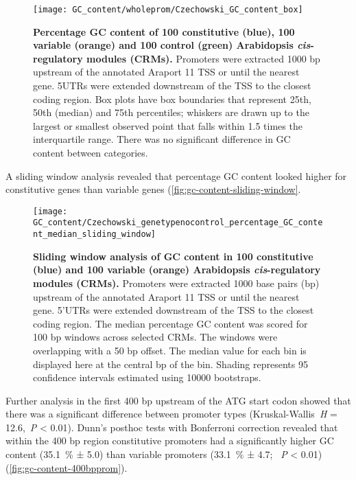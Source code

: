 \documentclass[../main.tex]{subfiles}
\begin{document}
\begin{figure}[hbt!]
	\begin{center}
		\capstart
		\texttt{[image: GC\_content/wholeprom/Czechowski\_GC\_content\_box]}
		\caption{
			\textbf{Percentage GC content of 100 constitutive (blue), 100 variable (orange) and 100 control (green) Arabidopsis \textit{cis}\hyp{}regulatory modules (CRMs).}
			Promoters were extracted 1000 bp upstream of the annotated Araport 11 \autocite{chengAraport11CompleteReannotation2017} TSS or until the nearest gene.
			5UTRs were extended downstream of the TSS to the closest coding region.  Box plots have box boundaries that represent 25th, 50th (median) and 75th percentiles; whiskers are drawn up to the largest or smallest observed point that falls within 1.5 times the interquartile range.
			There was no significant difference in GC content between categories.
			\label{fig:gc-content-wholeprom}
		}
	\end{center}
\end{figure}

A sliding window analysis revealed that percentage GC content looked higher for constitutive genes than variable genes (\autoref{fig:gc-content-sliding-window}.
\begin{figure}[hbt!]
	\begin{center}
		\capstart
		\texttt{[image: GC\_content/Czechowski\_genetypenocontrol\_percentage\_GC\_content\_median\_sliding\_window]}
		\caption{
			\textbf{Sliding window analysis of GC content in 100 constitutive (blue) and 100 variable (orange) Arabidopsis \textit{cis}\hyp{}regulatory modules (CRMs).}
			Promoters were extracted 1000 base pairs (bp) upstream of the annotated Araport 11 \autocite{chengAraport11CompleteReannotation2017} TSS or until the nearest gene.
			5'UTRs were extended downstream of the TSS to the closest coding region.
			The median percentage GC content was scored for 100 bp windows across selected CRMs.
			The windows were overlapping with a 50 bp offset.
			The median value for each bin is displayed here at the central bp of the bin.
			Shading represents 95 confidence intervals estimated using 10000 bootstraps.			
			\label{fig:gc-content-sliding-window}
		}
	\end{center}
\end{figure}

Further analysis in the first 400 bp upstream of the ATG start codon showed that there was a significant difference between promoter types (Kruskal\hyp{}Wallis~\textit{H} = 12.6,~\textit{P} \textless{} 0.01).
Dunn's posthoc tests with Bonferroni correction revealed that within the 400 bp region constitutive promoters had a significantly higher GC content (\SI{35.1}{\percent} ± 5.0) than variable promoters (\SI{33.1}{\percent} ± 4.7; ~\textit{P} \textless{} 0.01) (\autoref{fig:gc-content-400bpprom}).
\end{document}
